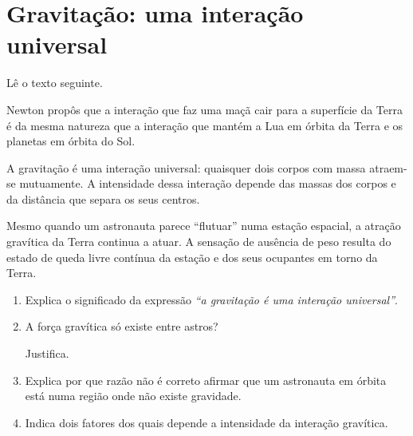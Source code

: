 \documentclass[11pt,a4paper]{article}
\newcommand{\resposta}[1][1]{
	\vspace{#1cm}
}
\begin{document}
	\section{Gravitação: uma interação universal}
	
	Lê o texto seguinte.
	
	\begin{tcolorbox}[
		colback=euflight,
		colframe=eufblue
		]
		
		Newton propôs que a interação que faz uma maçã cair para a superfície
		da Terra é da mesma natureza que a interação que mantém a Lua em órbita
		da Terra e os planetas em órbita do Sol.
		
		A gravitação é uma interação universal: quaisquer dois corpos com massa
		atraem-se mutuamente. A intensidade dessa interação depende das massas
		dos corpos e da distância que separa os seus centros.
		
		Mesmo quando um astronauta parece ``flutuar'' numa estação espacial,
		a atração gravítica da Terra continua a atuar. A sensação de ausência de
		peso resulta do estado de queda livre contínua da estação e dos seus
		ocupantes em torno da Terra.
		
	\end{tcolorbox}
	
	\begin{enumerate}[label=\textbf{\arabic*.}]
		
		\item Explica o significado da expressão
		\textit{``a gravitação é uma interação universal''}.
		
		\resposta[0.9]
		
		\item A força gravítica só existe entre astros?
		
		Justifica.
		
		\resposta[0.9]
		
		\item Explica por que razão não é correto afirmar que um astronauta em
		órbita está numa região onde não existe gravidade.
		
		\resposta[1.0]
		
		\item Indica dois fatores dos quais depende a intensidade da interação
		gravítica.
		
		\resposta[0.7]
		
	\end{enumerate}
	
\end{document}

